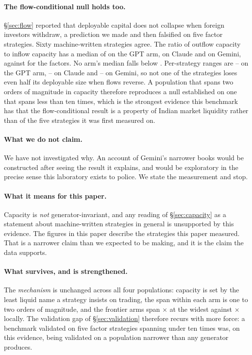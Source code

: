 \documentclass[11pt,a4paper]{article}
\begin{document}
\paragraph{The flow-conditional null holds too.} \S\ref{sec:flow} reported that deployable
capital does not collapse when foreign investors withdraw, a prediction we made and then falsified
on five factor strategies. Sixty machine-written strategies agree. The ratio of outflow
capacity to inflow capacity has a median of \fsGvGptFlowMedian{} on the GPT arm,
\fsGvClaudeFlowMedian{} on Claude and \fsGvGeminiFlowMedian{} on Gemini, against
\fsFlowRatioMedian{} for the factors. No arm's median falls below
\fsGvClaudeFlowMedian{}. Per-strategy ranges are
\fsGvGptFlowMin{}--\fsGvGptFlowMax{} on the GPT arm,
\fsGvClaudeFlowMin{}--\fsGvClaudeFlowMax{} on Claude and
\fsGvGeminiFlowMin{}--\fsGvGeminiFlowMax{} on Gemini, so not one of the
\fsGvTotal{} strategies loses even half its deployable size when flows reverse. A population that
spans two orders of magnitude in
capacity therefore reproduces a null established on one that spans less than ten times, which is
the strongest evidence this benchmark has that the flow-conditional result is a property of Indian
market liquidity rather than of the five strategies it was first measured on.

\paragraph{What we do not claim.} We have not investigated why. An account of Gemini's narrower
books would be constructed after seeing the result it explains, and would be exploratory in the
precise sense this laboratory exists to police. We state the measurement and stop.

\paragraph{What it means for this paper.} Capacity is \emph{not} generator-invariant, and any
reading of \S\ref{sec:capacity} as a statement about machine-written strategies in general is
unsupported by this evidence. The figures in this paper describe the strategies this paper measured.
That is a narrower claim than we expected to be making, and it is the claim the data supports.

\paragraph{What survives, and is strengthened.} The \emph{mechanism} is unchanged across all four
populations: capacity is set by the least liquid name a strategy insists on trading, the span within
each arm is one to two orders of magnitude, and the frontier arms span
\fsGvGeminiCapSpan{}$\times$ at the widest against \fsCorpusSpan{}$\times$ locally. The validation
gap of \S\ref{sec:validation} therefore recurs with more force: a benchmark validated on five
factor strategies spanning under ten times was, on this evidence, being validated on a population
narrower than any generator produces.
\end{document}
